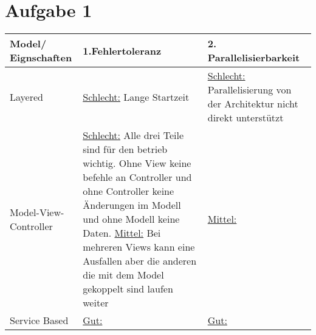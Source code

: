 \chapter*{Aufgabe 1}
\begin{center}
	\begin{tabular}	{|m{4cm}|m{6cm}|m{6cm}|}
		\hline
		Model/ Eignschaften & 1.Fehlertoleranz & 2. Parallelisierbarkeit  \\
		\hline 
		Layered & \underline{Schlecht:} Lange Startzeit &  \underline{Schlecht:} Parallelisierung von der Architektur nicht direkt unterstützt \\
		\hline 
		Model-View-Controller& \underline{Schlecht:}
		Alle drei Teile sind für den betrieb wichtig. Ohne View keine befehle an Controller und ohne Controller keine Änderungen im Modell und ohne Modell keine Daten.
		\underline{Mittel:} Bei mehreren Views kann eine Ausfallen aber die anderen die mit dem Model gekoppelt sind laufen weiter
		
				 & \underline{Mittel:}\\
		\hline 
		Service Based& 
		\underline{Gut:} & \underline{Gut:} \\
		\hline 
	\end{tabular}
\end{center}
